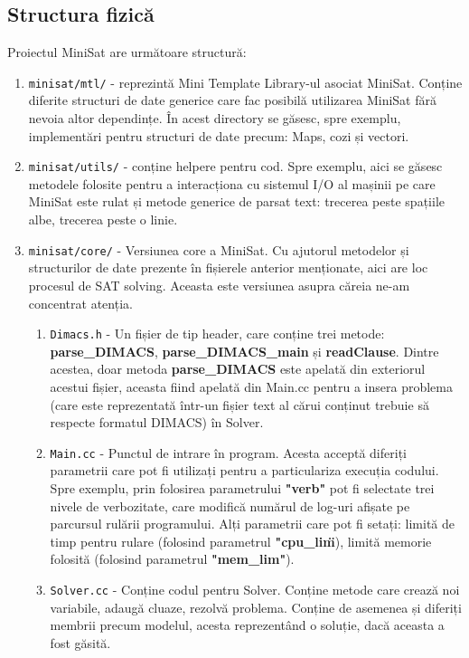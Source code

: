 \documentclass{llncs}
\begin{document}
\subsection{Structura fizică}
Proiectul MiniSat are următoare structură:
\begin{enumerate}
    \item \texttt{minisat/mtl/} - reprezintă Mini Template Library-ul asociat MiniSat. Conține diferite structuri de date generice care fac posibilă utilizarea MiniSat fără nevoia altor dependințe. În acest directory se găsesc, spre exemplu, implementări pentru structuri de date precum: Maps, cozi și vectori.
    \item \texttt{minisat/utils/} - conține helpere pentru cod. Spre exemplu, aici se găsesc metodele folosite pentru a interacționa cu sistemul I/O al mașinii pe care MiniSat este rulat și metode generice de parsat text: trecerea peste spațiile albe, trecerea peste o linie.
    \item \texttt{minisat/core/} - Versiunea core a MiniSat. Cu ajutorul metodelor și structurilor de date prezente în fișierele anterior menționate, aici are loc procesul de SAT solving. Aceasta este versiunea asupra căreia ne-am concentrat atenția.
    \begin{enumerate}
        \item \texttt{Dimacs.h} - Un fișier de tip header, care conține trei metode: \textbf{parse\_DIMACS}, \textbf{parse\_DIMACS\_main} și \textbf{readClause}. Dintre acestea, doar metoda \textbf{parse\_DIMACS} este apelată din exteriorul acestui fișier, aceasta fiind apelată din Main.cc pentru a insera problema (care este reprezentată într-un fișier text al cărui conținut trebuie să respecte formatul DIMACS) în Solver.
        \item \texttt{Main.cc} - Punctul de intrare în program. Acesta acceptă diferiți parametrii care pot fi utilizați pentru a particulariza execuția codului. Spre exemplu, prin folosirea parametrului \textbf{"verb"} pot fi selectate trei nivele de verbozitate, care modifică numărul de log-uri afișate pe parcursul rulării programului. Alți parametrii care pot fi setați: limită de timp pentru rulare (folosind parametrul \textbf{"cpu\_lim\"}), limită memorie folosită (folosind parametrul \textbf{"mem\_lim"}).
        \item \texttt{Solver.cc} - Conține codul pentru Solver. Conține metode care crează noi variabile, adaugă cluaze, rezolvă problema. Conține de asemenea și diferiți membrii precum modelul, acesta reprezentând o soluție, dacă aceasta a fost găsită.

\end{enumerate}
\end{enumerate}
\end{document}
